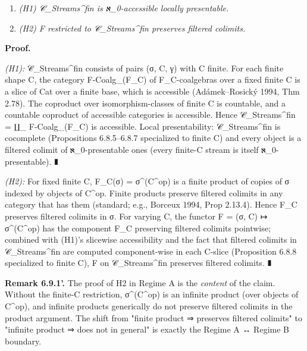 \documentclass[11pt, openany]{book}
\begin{document}
\begin{enumerate}
\item \textit{(H1) 𝒞\_\allowbreak{}Streams\textasciicircum{}{fin} is ℵ\_\allowbreak{}0-accessible locally presentable.}
\item \textit{(H2) F restricted to 𝒞\_\allowbreak{}Streams\textasciicircum{}{fin} preserves filtered colimits.}
\end{enumerate}

\textbf{Proof.}

\textit{(H1):} 𝒞\_\allowbreak{}Streams\textasciicircum{}{fin} consists of pairs (σ, C, γ) with C finite. For each finite shape C, the category F-Coalg\_(F\_\allowbreak{}C) of F\_\allowbreak{}C-coalgebras over a fixed finite C is a slice of Cat over a finite base, which is accessible (Adámek–Rosický 1994, Thm 2.78). The coproduct over isomorphism-classes of finite C is countable, and a countable coproduct of accessible categories is accessible. Hence 𝒞\_\allowbreak{}Streams\textasciicircum{}{fin} = ∐\_ F-Coalg\_(F\_\allowbreak{}C) is accessible. Local presentability: 𝒞\_\allowbreak{}Streams\textasciicircum{}{fin} is cocomplete (Propositions 6.8.5–6.8.7 specialized to finite C) and every object is a filtered colimit of ℵ\_\allowbreak{}0-presentable ones (every finite-C stream is itself ℵ\_\allowbreak{}0-presentable). ∎

\textit{(H2):} For fixed finite C, F\_\allowbreak{}C(σ) = σ\textasciicircum{}(C\textasciicircum{}op) is a finite product of copies of σ indexed by objects of C\textasciicircum{}op. Finite products preserve filtered colimits in any category that has them (standard; e.g., Borceux 1994, Prop 2.13.4). Hence F\_\allowbreak{}C preserves filtered colimits in σ. For varying C, the functor F = (σ, C) ↦ σ\textasciicircum{}(C\textasciicircum{}op) has the component F\_\allowbreak{}C preserving filtered colimits pointwise; combined with (H1)'s slicewise accessibility and the fact that filtered colimits in 𝒞\_\allowbreak{}Streams\textasciicircum{}{fin} are computed component-wise in each C-slice (Proposition 6.8.8 specialized to finite C), F on 𝒞\_\allowbreak{}Streams\textasciicircum{}{fin} preserves filtered colimits. ∎

\textbf{Remark 6.9.1'.} The proof of H2 in Regime A is the \textit{content} of the claim. Without the finite-C restriction, σ\textasciicircum{}(C\textasciicircum{}op) is an infinite product (over objects of C\textasciicircum{}op), and infinite products generically do not preserve filtered colimits in the product argument. The shift from "finite product ⇒ preserves filtered colimits" to "infinite product ⇒ does not in general" is exactly the Regime A ↔ Regime B boundary.
\end{document}

